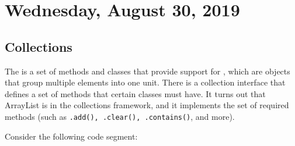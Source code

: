 \section{Wednesday, August 30, 2019}
\subsection{Collections}

The  is a set of methods and classes that provide support for , which are objects that group multiple elements into one unit. There is a collection interface that defines a set of methods that certain classes must have. It turns out that ArrayList is in the collections framework, and it implements the set of required methods (such as \verb!.add(), .clear(), .contains()!, and more).

Consider the following code segment:

